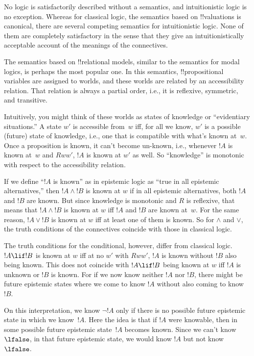 \documentclass[../../../include/open-logic-section]{subfiles}
\begin{document}


No logic is satisfactorily described without a semantics, and
intuitionistic logic is no exception. Whereas for classical logic, the
semantics based on !!{valuation}s is canonical, there are several
competing semantics for intuitionistic logic. None of them are
completely satisfactory in the sense that they give an
intuitionistically acceptable account of the meanings of the
connectives.

The semantics based on !!{relational model}s, similar to the semantics
for modal logics, is perhaps the most popular one.  In this semantics,
!!{propositional variable}s are assigned to worlds, and these worlds
are related by an accessibility relation. That relation is always a
partial order, i.e., it is reflexive, symmetric, and
transitive.

Intuitively, you might think of these worlds as states of knowledge or
``evidentiary situations.''  A state $w'$ is accessible from~$w$ iff,
for all we know, $w'$ is a possible (future) state of knowledge, i.e.,
one that is compatible with what's known at~$w$.  Once a proposition
is known, it can't become un-known, i.e., whenever $!A$ is known at~$w$
and $Rww'$, $!A$ is known at $w'$ as well. So ``knowledge'' is
monotonic with respect to the accessibility relation.

If we define ``$!A$ is known'' as in epistemic logic as ``true in all
epistemic alternatives,'' then $!A \land !B$ is known at $w$ if in all
epistemic alternatives, both $!A$ and $!B$ are known. But since
knowledge is monotonic and $R$ is reflexive, that means that $!A \land
!B$ is known at $w$ iff $!A$ and $!B$ are known at~$w$.  For the same
reason, $!A \lor !B$ is known at $w$ iff at least one of them is
known. So for $\land$ and $\lor$, the truth conditions of the
connectives coincide with those in classical logic.

The truth conditions for the conditional, however, differ from
classical logic. $!A \lif !B$ is known at $w$ iff at no $w'$ with
$Rww'$, $!A$ is known without $!B$ also being known. This does not
coincide with $!A \lif !B$ being known at $w$ iff $!A$ is unknown or
$!B$ is known. For if we now know neither $!A$ nor $!B$, there might
be future epistemic states where we come to know $!A$ without also
coming to know~$!B$.

On this interpretation, we know $\lnot !A$ only if there is no
possible future epistemic state in which we know~$!A$. Here the idea
is that if $!A$ were knowable, then in some possible future epistemic
state~$!A$ becomes known. Since we can't know $\lfalse$, in that
future epistemic state, we would know $!A$ but not know~$\lfalse$. 
\end{document}
